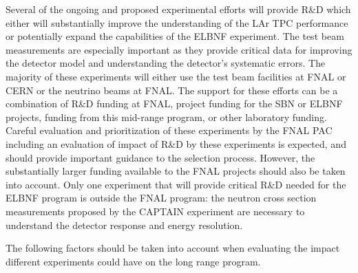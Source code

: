 Several of the ongoing and proposed experimental efforts will provide R\&D which either will substantially improve the understanding of the LAr TPC performance or potentially expand the capabilities of the  ELBNF experiment. The test beam measurements are especially important as they provide critical data for improving the detector model and understanding the detector's systematic errors. The majority of these experiments will either use the test beam facilities at FNAL or CERN or the neutrino beams at FNAL. The support for these efforts can be a combination of R\&D funding at FNAL, project funding for the SBN or ELBNF projects, funding from this mid-range program, or other laboratory funding. Careful evaluation and prioritization of these experiments by the FNAL PAC including an evaluation of impact of R\&D by these experiments is expected, and should provide important guidance to the selection process. However, the substantially larger funding available to the FNAL projects should also be taken into account. Only one experiment that will provide critical R\&D needed for the ELBNF program is outside the FNAL program: the neutron cross section measurements proposed by the CAPTAIN experiment are necessary to understand the detector response and energy resolution. 

The following factors should be taken into account when evaluating the impact different experiments could have on the long range program.

